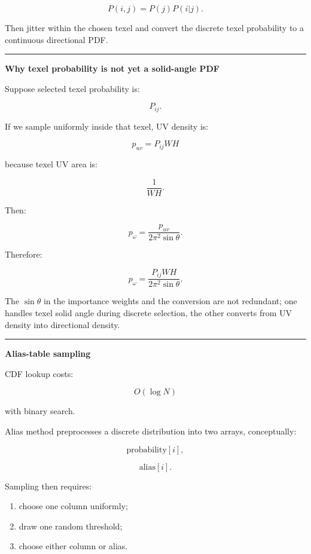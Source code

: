 \[
\boxed{
P(i,j)=P(j)P(i|j).
}
\]

Then jitter within the chosen texel and convert the discrete texel probability to a continuous directional PDF.

\begin{center}\rule{0.5\linewidth}{0.5pt}\end{center}

\textbf{Why texel probability is not yet a solid-angle PDF}

Suppose selected texel probability is:

\[
P_{ij}.
\]

If we sample uniformly inside that texel, UV density is:

\[
p_{uv}
=
P_{ij}
WH
\]

because texel UV area is:

\[
\frac1{WH}.
\]

Then:

\[
p_\omega
=
\frac{
p_{uv}
}{
2\pi^2\sin\theta
}.
\]

Therefore:

\[
\boxed{
p_\omega
=
\frac{
P_{ij}WH
}{
2\pi^2\sin\theta
}.
}
\]

The \(\sin\theta\) in the importance weights and the conversion are not redundant; one handles texel solid angle during discrete selection, the other converts from UV density into directional density.

\begin{center}\rule{0.5\linewidth}{0.5pt}\end{center}

\textbf{Alias-table sampling}

CDF lookup costs:

\[
O(\log N)
\]

with binary search.

Alias method preprocesses a discrete distribution into two arrays, conceptually:

\[
\text{probability}[i],
\]

\[
\text{alias}[i].
\]

Sampling then requires:

\begin{enumerate}
\def\labelenumi{\arabic{enumi}.}
\tightlist
\item
  choose one column uniformly;
\item
  draw one random threshold;
\item
  choose either column or alias.
\end{enumerate}

